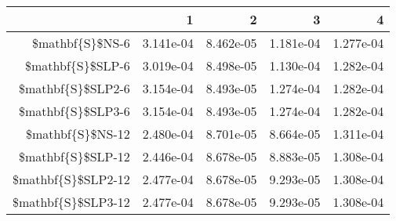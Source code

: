 \begin{table}[ht]
\centering
\begin{tabular}{rrrrr}
  \hline
 & 1 & 2 & 3 & 4 \\ 
  \hline
\$mathbf\{S\}\$NS-6 & 3.141e-04 & 8.462e-05 & 1.181e-04 & 1.277e-04 \\ 
  \$mathbf\{S\}\$SLP-6 & 3.019e-04 & 8.498e-05 & 1.130e-04 & 1.282e-04 \\ 
  \$mathbf\{S\}\$SLP2-6 & 3.154e-04 & 8.493e-05 & 1.274e-04 & 1.282e-04 \\ 
  \$mathbf\{S\}\$SLP3-6 & 3.154e-04 & 8.493e-05 & 1.274e-04 & 1.282e-04 \\ 
  \$mathbf\{S\}\$NS-12 & 2.480e-04 & 8.701e-05 & 8.664e-05 & 1.311e-04 \\ 
  \$mathbf\{S\}\$SLP-12 & 2.446e-04 & 8.678e-05 & 8.883e-05 & 1.308e-04 \\ 
  \$mathbf\{S\}\$SLP2-12 & 2.477e-04 & 8.678e-05 & 9.293e-05 & 1.308e-04 \\ 
  \$mathbf\{S\}\$SLP3-12 & 2.477e-04 & 8.678e-05 & 9.293e-05 & 1.308e-04 \\ 
   \hline
\end{tabular}
\end{table}
